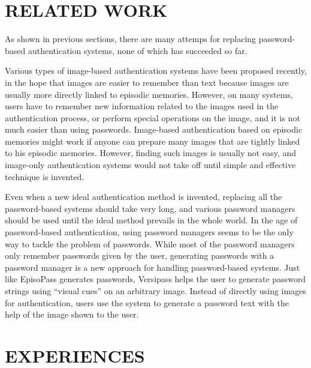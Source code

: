 \documentclass{sigchi}
\begin{document}
\section{RELATED WORK}

As shown in previous sections,
there are many attemps for replacing password-based authentication systems,
none of which has succeeded so far.

Various types of image-based authentication systems have been proposed recently,
in the hope that images are easier to remember than text
because images are usually more directly linked to episodic memories.
However, on many systems,
users have to remember new information related to the images
used in the authentication process, or
perform special operations on the image, and
it is not much easier than using passwords.
%
Image-based authentication based on episodic memories might work
if anyone can prepare many images 
that are tightly linked to his episodic memories.
However, finding such images is usually not easy, and
image-only authentication systems would not take off
until simple and effective technique is invented.

Even when a new ideal authentication method is invented,
replacing all the password-based systems should take very long, and
various password managers should be used until the ideal method
prevails in the whole world.
In the age of password-based authentication,
using password managers seems to be the only way to tackle
the problem of passwords.
%
While most of the password managers only remember passwords given by the user,
generating passwords with a password manager is a new approach for
handling password-based systems.
Just like EpisoPass generates passwords,
Versipass\cite{Stobert:2014:PMD:2683467.2683471} %
helps the user to generate password strings
using ``visual cues'' on an arbitrary image.
Instead of directly using images for authentication,
users use the system to generate a password text with the help of
the image shown to the user.

% 
% 
% 
% 
% 
%

\section{EXPERIENCES}
\end{document}

